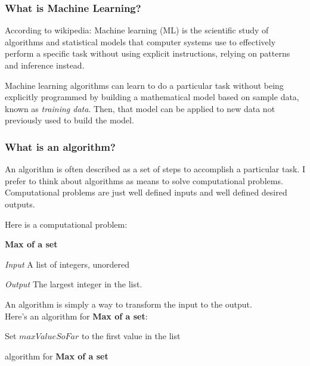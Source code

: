 \documentclass[12pt]{article}
\begin{document}
\subsubsection{What is Machine Learning?}

According to wikipedia:
Machine learning (ML) is the scientific study of algorithms and statistical models that computer systems use to effectively perform a specific task without using explicit instructions, relying on patterns and inference instead.

Machine learning algorithms can learn to do a particular task without being explicitly programmed by building a mathematical model based on sample data, known as \textit{training data}. Then, that model can be applied to new data not previously used to build the model.

\subsubsection{What is an algorithm?}

An algorithm is often described as a set of steps to accomplish a particular task. I prefer to think about algorithms as means to solve computational problems. Computational problems are just well defined inputs and well defined desired outputs.

Here is a computational problem:

\textbf{Max of a set}

\textit{Input} A list of integers, unordered

\textit{Output} The largest integer in the list. 

An algorithm is simply a way to transform the input to the output. \\


Here's an algorithm for \textbf{Max of a set}:\\

\begin{algorithm}[H]
    \SetAlgoLined
    Set $maxValueSoFar$ to the first value in the list \\
    
    \caption{algorithm for \textbf{Max of a set}}
\end{algorithm}
\end{document}
